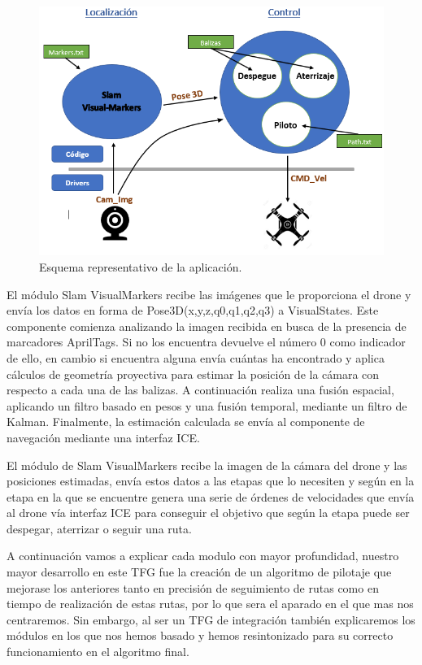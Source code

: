 \begin{figure}[H]
	\begin{center}
		\includegraphics[width=1.1\textwidth]{imag/IMG31.PNG}
				\caption{Esquema representativo de la aplicación.}
		\label{fig:Esquema representativo.}	
	\end{center}
\end{figure}

\hspace{1cm} El módulo Slam VisualMarkers recibe las imágenes que le proporciona el drone y envía los datos en forma de Pose3D(x,y,z,q0,q1,q2,q3) a VisualStates. Este componente comienza analizando la imagen recibida en busca de la presencia de marcadores AprilTags. Si no los encuentra devuelve el número 0 como indicador de ello, en cambio si encuentra alguna envía cuántas ha encontrado y aplica cálculos de geometría proyectiva para estimar la posición de la cámara con respecto a cada una de las balizas. A continuación realiza una fusión espacial, aplicando un filtro basado en pesos y una fusión temporal, mediante un filtro de Kalman. Finalmente, la estimación calculada se envía al componente de navegación mediante una interfaz ICE.

\hspace{1cm} El módulo de Slam VisualMarkers recibe la imagen de la cámara del drone y las posiciones estimadas, envía estos datos a las etapas que lo necesiten y según en la etapa en la que se encuentre genera una serie de órdenes de velocidades que envía al drone vía interfaz ICE para conseguir el objetivo que según la etapa puede ser despegar, aterrizar o seguir una ruta.

\hspace{1cm} A continuación vamos a explicar cada modulo con mayor profundidad, nuestro mayor desarrollo en este TFG fue la creación de un algoritmo de pilotaje que mejorase los anteriores tanto en precisión de seguimiento de rutas como en tiempo de realización de estas rutas, por lo que sera el aparado en el que mas nos centraremos. Sin embargo, al ser un TFG de integración también explicaremos los módulos en los que nos hemos basado y hemos resintonizado para su correcto funcionamiento en el algoritmo final. 

